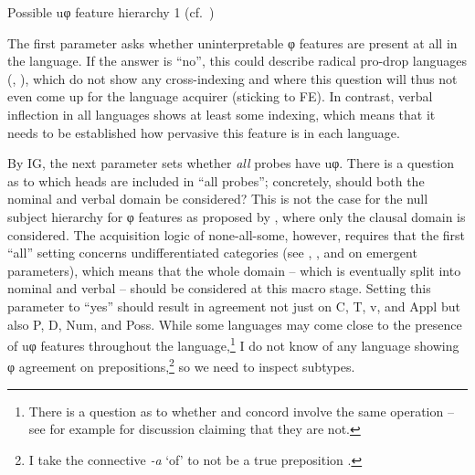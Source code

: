 \documentclass[output=paper]{langsci/langscibook}
\begin{document}
\ea\label{bkm:Ref255201037}\label{ex:vdwal:3.27} Possible uφ feature hierarchy 1
(cf.\ \citealt{RobHol2010,Roberts2012,Roberts2014})
\z

The first parameter asks whether uninterpretable φ features are present at all
in the language. If the answer is \enquote{no}, this could describe radical pro-drop
languages (\citealt{Saito2007},
\citealt{Roberts2010,Roberts2012,Roberts2014,Roberts2019}), which do
not show any cross-indexing and where this question will thus not even come up
for the language acquirer (sticking to \gls{FE}). In contrast, verbal inflection in
all  languages shows at least some indexing, which means that it needs to
be established how pervasive this feature is in each language.

By \gls{IG}, the next parameter sets whether \emph{all} probes have uφ. There
is a question as to which heads are included in \enquote{all probes}; concretely,
should both the nominal and verbal domain be considered? This is not the case
for the null subject hierarchy for φ features as proposed by
\citet{RobHol2010}, where only the clausal domain is considered. The
acquisition logic of none-all-some, however, requires that the first
\enquote{all}
setting concerns undifferentiated categories (see
\citealt{Biberauer2011,Biberauer2018}, \citealt{Bazalgette2015}, and
\citealt{BibRob2017} on emergent parameters), which means that the
whole domain – which is eventually split into nominal and verbal – should be
considered at this macro stage. Setting this parameter to \enquote{yes} should result in
agreement not just on C, T, v, and Appl but also P, D, Num, and Poss. While
some  languages may come close to the presence of uφ features throughout
the language,\footnote{There is a question as to whether  and concord
involve the same operation – see for example \citet{Giusti2008} for discussion
claiming that they are not.} I do not know of any  language showing φ
agreement on prepositions,\footnote{I take the  connective \emph{-a} ‘of’
to not be a true preposition \parencite{vandeVelde2013}.} so we need to inspect
subtypes.
\end{document}
